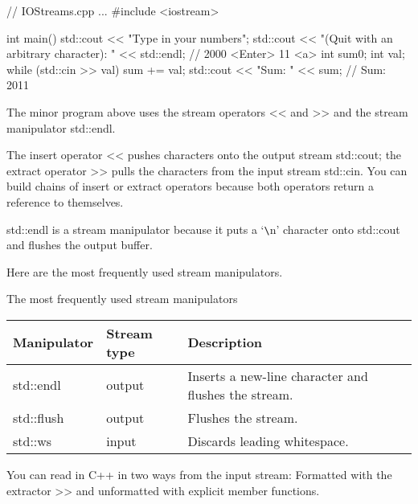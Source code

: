 
\begin{cpp}
// IOStreams.cpp
...
#include <iostream>

int main(){
	std::cout << "Type in your numbers";
	std::cout << "(Quit with an arbitrary character): " << std::endl;
				// 2000 <Enter> 11 <a>
	int sum{0};
	int val;
	while (std::cin >> val) sum += val;
	std::cout << "Sum: " << sum; // Sum: 2011
}
\end{cpp}

The minor program above uses the stream operators <{}< and >{}> and the stream manipulator std::endl.

The insert operator <{}< pushes characters onto the output stream std::cout; the extract operator >{}> pulls the characters from the input stream std::cin. You can build chains of insert or extract operators because both operators return a reference to themselves.

std::endl is a stream manipulator because it puts a ‘\verb|\|n’ character onto std::cout and flushes the output buffer.

Here are the most frequently used stream manipulators.

\begin{center}
The most frequently used stream manipulators
\end{center}

\begin{longtable}[c]{|l|l|l|}
\hline
\textbf{Manipulator} & \textbf{Stream type} & \textbf{Description}                                 \\ \hline
\endfirsthead
%
\endhead
%
std::endl            & output               & Inserts a new-line character and flushes the stream. \\ \hline
std::flush           & output               & Flushes the stream.                                  \\ \hline
std::ws              & input                & Discards leading whitespace.                         \\ \hline
\end{longtable}


You can read in C++ in two ways from the input stream: Formatted with the extractor >> and unformatted with explicit member functions.

